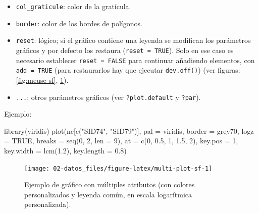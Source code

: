 \documentclass[
  spanish,
]{book}
\newenvironment{Shaded}{\begin{snugshade}}{\end{snugshade}}
\newcommand{\AttributeTok}[1]{\textcolor[rgb]{0.77,0.63,0.00}{#1}}
\newcommand{\ConstantTok}[1]{\textcolor[rgb]{0.00,0.00,0.00}{#1}}
\newcommand{\DecValTok}[1]{\textcolor[rgb]{0.00,0.00,0.81}{#1}}
\newcommand{\FloatTok}[1]{\textcolor[rgb]{0.00,0.00,0.81}{#1}}
\newcommand{\FunctionTok}[1]{\textcolor[rgb]{0.00,0.00,0.00}{#1}}
\newcommand{\NormalTok}[1]{#1}
\newcommand{\StringTok}[1]{\textcolor[rgb]{0.31,0.60,0.02}{#1}}
\theoremstyle{break}
\begin{document}
\begin{itemize}
\item
  \texttt{col\_graticule}: color de la gratícula.
\item
  \texttt{border}: color de los bordes de polígonos.
\item
  \texttt{reset}: lógico; si el gráfico contiene una leyenda se modifican los parámetros gráficos y por defecto los restaura (\texttt{reset\ =\ TRUE}). Solo en ese caso es necesario establecer \texttt{reset\ =\ FALSE} para continuar añadiendo elementos, con \texttt{add\ =\ TRUE} (para restaurarlos hay que ejecutar \texttt{dev.off()}) (ver figuras: \ref{fig:meuse-sf}, \ref{fig:multi-plot-sf}).
\item
  \texttt{...}: otros parámetros gráficos (ver \texttt{?plot.default} y \texttt{?par}).
\end{itemize}

Ejemplo:

\begin{Shaded}
\begin{Highlighting}[]
\FunctionTok{library}\NormalTok{(viridis)}
\FunctionTok{plot}\NormalTok{(nc[}\FunctionTok{c}\NormalTok{(}\StringTok{"SID74"}\NormalTok{, }\StringTok{"SID79"}\NormalTok{)], }\AttributeTok{pal =}\NormalTok{ viridis, }\AttributeTok{border =} \StringTok{\textquotesingle{}grey70\textquotesingle{}}\NormalTok{, }\AttributeTok{logz =} \ConstantTok{TRUE}\NormalTok{, }
     \AttributeTok{breaks =} \FunctionTok{seq}\NormalTok{(}\DecValTok{0}\NormalTok{, }\DecValTok{2}\NormalTok{, }\AttributeTok{len =} \DecValTok{9}\NormalTok{), }\AttributeTok{at =} \FunctionTok{c}\NormalTok{(}\DecValTok{0}\NormalTok{, }\FloatTok{0.5}\NormalTok{, }\DecValTok{1}\NormalTok{, }\FloatTok{1.5}\NormalTok{, }\DecValTok{2}\NormalTok{), }
     \AttributeTok{key.pos =} \DecValTok{1}\NormalTok{, }\AttributeTok{key.width =} \FunctionTok{lcm}\NormalTok{(}\FloatTok{1.2}\NormalTok{), }\AttributeTok{key.length =} \FloatTok{0.8}\NormalTok{) }
\end{Highlighting}
\end{Shaded}

\begin{figure}[!htb]

{\centering \texttt{[image: 02-datos\_files/figure-latex/multi-plot-sf-1]} 

}

\caption{Ejemplo de gráfico con múltiples atributos (con colores personalizados y leyenda común, en escala logarítmica personalizada).}\label{fig:multi-plot-sf}
\end{figure}
\end{document}
